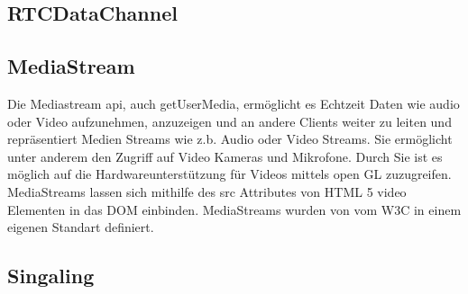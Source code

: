
\subsection{RTCDataChannel}



\subsection{MediaStream}
Die Mediastream api, auch getUserMedia, ermöglicht es Echtzeit Daten wie audio oder Video aufzunehmen, anzuzeigen und an andere Clients weiter zu leiten und repräsentiert Medien Streams wie z.b. Audio oder Video Streams. Sie ermöglicht unter anderem den Zugriff auf Video Kameras und Mikrofone. Durch Sie ist es möglich auf die Hardwareunterstützung für Videos mittels open GL zuzugreifen. MediaStreams lassen sich mithilfe des src Attributes von HTML 5 video Elementen in das DOM einbinden. MediaStreams wurden von vom W3C in einem eigenen Standart definiert.\cite{w3MediaStream} 

\subsection{Singaling}


